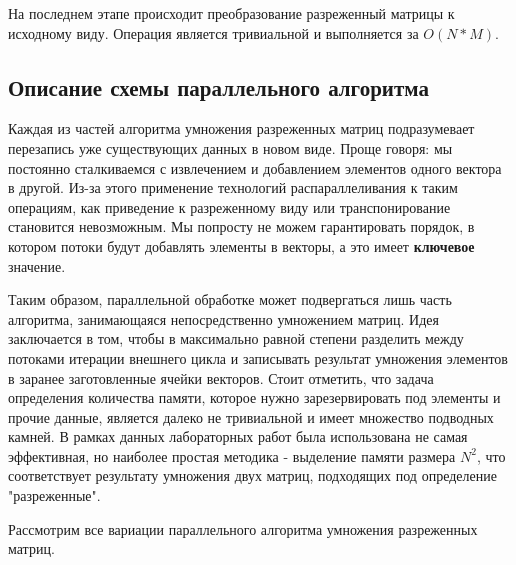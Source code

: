 \documentclass[12pt]{article}
\begin{document}
На последнем этапе происходит преобразование разреженный матрицы к исходному виду. Операция является тривиальной и выполняется за $O(N *M)$.\newpage
\begin{center}
    \section*{Описание схемы параллельного алгоритма}
\end{center}
Каждая из частей алгоритма умножения разреженных матриц подразумевает перезапись уже существующих данных в новом виде. Проще говоря: мы постоянно сталкиваемся с извлечением и добавлением элементов одного вектора в другой. Из-за этого применение технологий распараллеливания к таким операциям, как приведение к разреженному виду или транспонирование становится невозможным. Мы попросту не можем гарантировать порядок, в котором потоки будут добавлять элементы в векторы, а это имеет \textbf{ключевое} значение.

Таким образом, параллельной обработке может подвергаться лишь часть алгоритма, занимающаяся непосредственно умножением матриц. Идея заключается в том, чтобы в максимально равной степени разделить между потоками итерации внешнего цикла и записывать результат умножения элементов в заранее заготовленные ячейки векторов. Стоит отметить, что задача определения количества памяти, которое нужно зарезервировать под элементы и прочие данные, является далеко не тривиальной и имеет множество подводных камней. В рамках данных лабораторных работ была использована не самая эффективная, но наиболее простая методика - выделение памяти размера $N^2$, что соответствует результату умножения двух матриц, подходящих под определение "разреженные".

Рассмотрим все вариации параллельного алгоритма умножения разреженных матриц.\newpage
\end{document}
